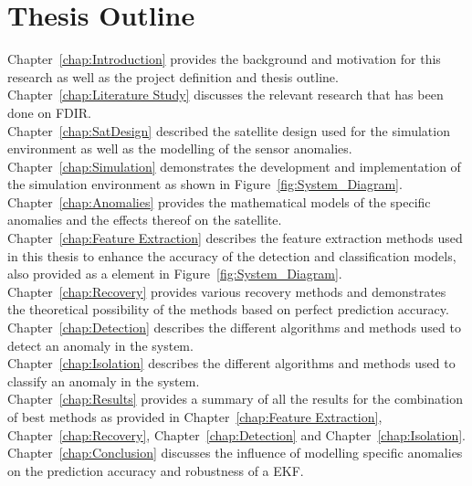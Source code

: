 \section{Thesis Outline}
Chapter~\ref{chap:Introduction} provides the background and motivation for this research as well as the project definition and thesis outline.
\\
Chapter~\ref{chap:Literature Study} discusses the relevant research that has been done on FDIR.
\\
Chapter~\ref{chap:SatDesign} described the satellite design used for the simulation environment as well as the modelling of the sensor anomalies.
\\
Chapter~\ref{chap:Simulation} demonstrates the development and implementation of the simulation environment as shown in Figure~\ref{fig:System_Diagram}.
\\
Chapter~\ref{chap:Anomalies} provides the mathematical models of the specific anomalies and the effects thereof on the satellite.
\\
Chapter~\ref{chap:Feature Extraction} describes the feature extraction methods used in this thesis to enhance the accuracy of the detection and classification models, also provided as a element in Figure~\ref{fig:System_Diagram}.
\\
Chapter~\ref{chap:Recovery} provides various recovery methods and demonstrates the theoretical possibility of the methods based on perfect prediction accuracy.
\\
Chapter~\ref{chap:Detection} describes the different algorithms and methods used to detect an anomaly in the system.
\\
Chapter~\ref{chap:Isolation} describes the different algorithms and methods used to classify an anomaly in the system.
\\
Chapter~\ref{chap:Results} provides a summary of all the results for the combination of best methods as provided in Chapter~\ref{chap:Feature Extraction}, Chapter~\ref{chap:Recovery}, Chapter~\ref{chap:Detection} and Chapter~\ref{chap:Isolation}.
\\
Chapter~\ref{chap:Conclusion} discusses the influence of modelling specific anomalies on the prediction accuracy and robustness of a EKF.